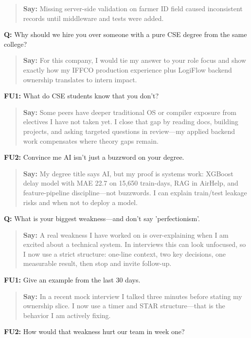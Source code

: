 \documentclass[9pt,a4paper]{article}
\begin{document}
\begin{quote}\small\textbf{Say:} Missing server-side validation on farmer ID field caused inconsistent records until middleware and tests were added.\end{quote}
\vspace{2mm}
\textbf{Q:} Why should we hire you over someone with a pure CSE degree from the same college?

\begin{quote}\small\textbf{Say:} For this company, I would tie my answer to your role focus and show exactly how my IFFCO production experience plus LogiFlow backend ownership translates to intern impact.\end{quote}
\vspace{2mm}
\textbf{FU1:} What do CSE students know that you don't?

\begin{quote}\small\textbf{Say:} Some peers have deeper traditional OS or compiler exposure from electives I have not taken yet. I close that gap by reading docs, building projects, and asking targeted questions in review---my applied backend work compensates where theory gaps remain.\end{quote}
\vspace{2mm}
\textbf{FU2:} Convince me AI isn't just a buzzword on your degree.

\begin{quote}\small\textbf{Say:} My degree title says AI, but my proof is systems work: XGBoost delay model with MAE 22.7 on 15,650 train-days, RAG in AirHelp, and feature-pipeline discipline---not buzzwords. I can explain train/test leakage risks and when not to deploy a model.\end{quote}
\vspace{2mm}
\textbf{Q:} What is your biggest weakness---and don't say 'perfectionism'.

\begin{quote}\small\textbf{Say:} A real weakness I have worked on is over-explaining when I am excited about a technical system. In interviews this can look unfocused, so I now use a strict structure: one-line context, two key decisions, one measurable result, then stop and invite follow-up.\end{quote}
\vspace{2mm}
\textbf{FU1:} Give an example from the last 30 days.

\begin{quote}\small\textbf{Say:} In a recent mock interview I talked three minutes before stating my ownership slice. I now use a timer and STAR structure---that is the behavior I am actively fixing.\end{quote}
\vspace{2mm}
\textbf{FU2:} How would that weakness hurt our team in week one?
\end{document}
